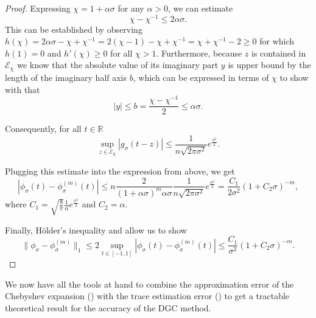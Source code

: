 \begin{proof}
    Expressing $\chi = 1 + \alpha \sigma$ for any $\alpha > 0$,
    we can estimate
    \begin{equation}
        \chi - \chi^{-1} \leq 2\alpha\sigma.
        \label{equ:2-chebyshev-bernstein-proof-estimate}
    \end{equation}
    This can be established by observing
    $h(\chi) = 2\alpha\sigma - \chi + \chi^{-1} = 2(\chi - 1) - \chi + \chi^{-1} = \chi + \chi^{-1} - 2 \geq 0$
    for which $h(1) = 0$ and $h'(\chi) \geq 0$ for all $\chi > 1$.
    Furthermore, because $z$ is
    contained in $\mathcal{E}_{\chi}$ we know that the absolute value of its
    imaginary part $y$ is upper bound by the length of the imaginary half axis $b$,
    which can be expressed in terms of $\chi$ to show with 
    that
    \begin{equation}
        |y| \leq b = \frac{\chi - \chi^{-1}}{2} \leq \alpha\sigma.
    \end{equation}

    Consequently, for all $t \in \mathbb{R}$
    \begin{equation}
        \sup_{z \in \mathcal{E}_{\chi}} |g_{\sigma}(t - z)| 
        \leq \frac{1}{n \sqrt{2 \pi \sigma^2}} e^{\frac{\alpha^2}{2}}.
    \end{equation}

    Plugging this estimate into the expression from above, we get
    \begin{equation}
        \left| \phi_{\sigma}(t) - \phi_{\sigma}^{(m)}(t) \right|
        \leq n \frac{2}{(1 + \alpha\sigma)^{m}\alpha \sigma} \frac{1}{n \sqrt{2 \pi \sigma^2}} e^{\frac{\alpha^2}{2}}
        = \frac{C_1}{2 \sigma^2} (1 + C_2 \sigma)^{-m},
        \label{equ:2-chebyshev-uniform-bound}
    \end{equation}
    where $C_1=\sqrt{\frac{8}{\pi}}\frac{1}{\alpha}e^{\frac{\alpha^2}{2}}$ and $C_2=\alpha$.

    Finally, Hölder's inequality \cite{klenke2013probability} and 
     allow us to show
    \begin{equation}
        \lVert \phi_{\sigma} - \phi_{\sigma}^{(m)} \rVert _1
            \leq 2 \sup_{t \in [-1, 1]} \left| \phi_{\sigma}(t) - \phi_{\sigma}^{(m)}(t) \right|
            \leq \frac{C_1}{\sigma^2} (1 + C_2 \sigma)^{-m}.
    \end{equation}
\end{proof}

We now have all the tools at hand to combine the approximation error of the
Chebyshev expansion () with the trace estimation
error () to get a tractable theoretical
result for the accuracy of the \gls{DGC} method.

